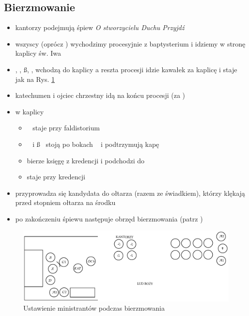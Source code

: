 \subsection{Bierzmowanie}
\begin{itemize}
	\item kantorzy podejmują śpiew \textit{O stworzycielu Duchu Przyjdź}
	\item wszyscy (oprócz \paschal) wychodzimy procesyjnie z baptysterium i
	      idziemy w stronę kaplicy św. Iwa
	\item \ii, \dd, \ss, ,  wchodzą do kaplicy a reszta procesji idzie
	      kawałek za kaplicę i staje jak na Rys. \ref{fig:bierzmowania}
	\item katechumen i ojciec chrzestny idą na końcu procesji (za \ii)
	\item w kaplicy
	      \begin{itemize}
		      \item \ii~ staje przy faldistorium
		      \item \dd~ i \ss~ stoją po bokach \ii~ i podtrzymują kapę
		      \item {} bierze księgę z kredencji i podchodzi do \ii~
		      \item {} staje przy kredencji
	      \end{itemize}
	\item przyprowadza się kandydata do ołtarza (razem ze świadkiem), którzy
	      klękają przed stopniem ołtarza na środku
	\item po zakończeniu śpiewu następuje obrzęd bierzmowania (patrz
	      \textit{})
\end{itemize}
\begin{figure}[H]
	\centering
	\includegraphics[width=\linewidth]{Figures/Iwo.pdf}
	\caption{Ustawienie ministrantów podczas bierzmowania}
	\label{fig:bierzmowania}
\end{figure}
